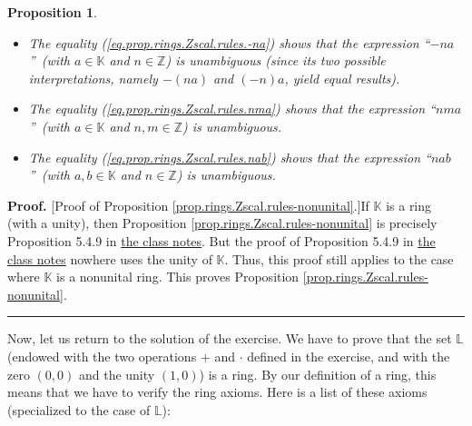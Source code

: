 \documentclass[paper=a4, fontsize=12pt]{scrartcl}%
\theoremstyle{plainsl}
\newtheorem{proposition}[theorem]{Proposition}
\theoremstyle{definition}
\theoremstyle{remark}
\newenvironment{proof}[1][Proof]{\noindent\textbf{#1.} }{\ \rule{0.5em}{0.5em}}
\begin{document}
\begin{proposition}
\begin{itemize}
\item The equality (\ref{eq.prop.rings.Zscal.rules.-na}) shows that the
expression \textquotedblleft$-na$\textquotedblright\ (with $a\in\mathbb{K}$
and $n\in\mathbb{Z}$) is unambiguous (since its two possible interpretations,
namely $-\left(  na\right)  $ and $\left(  -n\right)  a$, yield equal results).

\item The equality (\ref{eq.prop.rings.Zscal.rules.nma}) shows that the
expression \textquotedblleft$nma$\textquotedblright\ (with $a\in\mathbb{K}$
and $n,m\in\mathbb{Z}$) is unambiguous.

\item The equality (\ref{eq.prop.rings.Zscal.rules.nab}) shows that the
expression \textquotedblleft$nab$\textquotedblright\ (with $a,b\in\mathbb{K}$
and $n\in\mathbb{Z}$) is unambiguous.
\end{itemize}
\end{proposition}

\begin{proof}
[Proof of Proposition \ref{prop.rings.Zscal.rules-nonunital}.]If $\mathbb{K}$
is a ring (with a unity), then Proposition
\ref{prop.rings.Zscal.rules-nonunital} is precisely Proposition 5.4.9 in
\href{http://www.cip.ifi.lmu.de/~grinberg/t/19s/notes.pdf}{the class notes}.
But the proof of Proposition 5.4.9 in
\href{http://www.cip.ifi.lmu.de/~grinberg/t/19s/notes.pdf}{the class notes}
nowhere uses the unity of $\mathbb{K}$. Thus, this proof still applies to the
case where $\mathbb{K}$ is a nonunital ring. This proves Proposition
\ref{prop.rings.Zscal.rules-nonunital}.
\end{proof}

Now, let us return to the solution of the exercise. We have to prove that the
set $\mathbb{L}$ (endowed with the two operations $+$ and $\cdot$ defined in
the exercise, and with the zero $\left(  0,0\right)  $ and the unity $\left(
1,0\right)  $) is a ring. By our definition of a ring, this means that we have
to verify the ring axioms. Here is a list of these axioms (specialized to the
case of $\mathbb{L}$):
\end{document}
